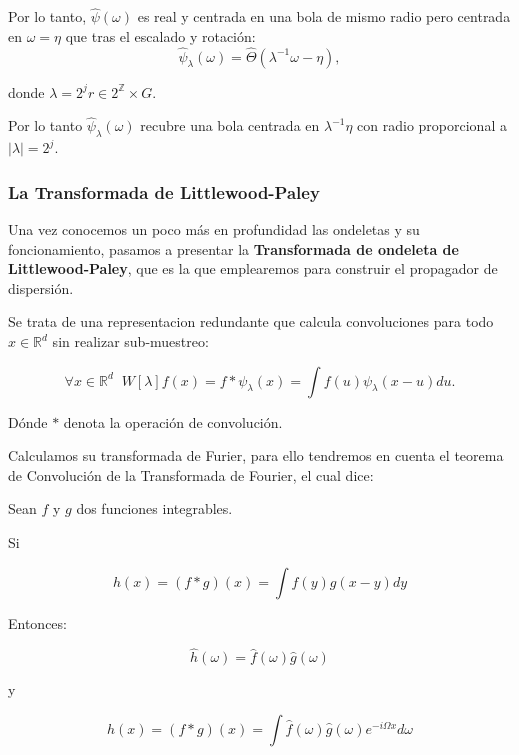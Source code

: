 \medskip

\noindent Por lo tanto, $\widehat{\psi}(\omega)$ es real y centrada en una bola de mismo radio pero centrada en $\omega=\eta$ que tras el escalado y rotación: 
$$\widehat{\psi}_\lambda(\omega)= \widehat{\Theta} (\lambda^{-1}\omega-\eta),$$ 

\noindent donde $\lambda=2^jr \in 2^{\mathbb{Z}}\times G$. 

\noindent Por lo tanto $\widehat{\psi}_\lambda(\omega)$ recubre una bola centrada en $\lambda^{-1}\eta$ con radio proporcional a $|\lambda|=2^j$.
 
\medskip 

\subsubsection{La Transformada de Littlewood-Paley}

\noindent Una vez conocemos un poco más en profundidad las ondeletas y su foncionamiento, pasamos a presentar la \textbf{Transformada de ondeleta de Littlewood-Paley}, que es la que emplearemos para construir el propagador de dispersión.

\noindent Se trata de una representacion redundante que calcula convoluciones para todo $x \in \mathbb{R}^d$ sin realizar sub-muestreo: 

\begin{equation}
  \forall x \in  \mathbb{R}^d \;\; W[\lambda]f(x)= f \ast \psi_\lambda(x)=\int f(u)\psi_\lambda(x-u) du .
\end{equation}

\noindent Dónde $\ast$ denota la operación de convolución. 

\medskip

\noindent Calculamos su transformada de Furier, para ello tendremos en cuenta el teorema de Convolución de la Transformada de Fourier, el cual dice: 

\begin{teorema} \label{Teorema::Convolucion}
 Sean $f$ y $g$ dos funciones integrables.

 Si 

 $$h(x)=(f\ast g)(x)=\int f(y)g(x-y) dy$$

 Entonces: 

 $$\widehat{h}(\omega)=\widehat{f}(\omega) \widehat{g}(\omega)$$

 y 

 $$h(x)=(f \ast g)(x)= \int \widehat{f}(\omega) \widehat{g}(\omega) e^{-i\Omega x} d\omega$$
 
\end{teorema}

